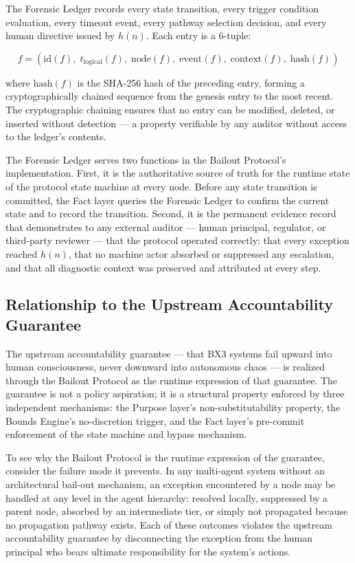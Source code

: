 The Forensic Ledger records every state transition, every trigger condition
evaluation, every timeout event, every pathway selection decision, and every
human directive issued by $h(n)$.  Each entry is a 6-tuple:

\[
f = (\text{id}(f),\; t_{\text{logical}}(f),\; \text{node}(f),\; \text{event}(f),\; \text{context}(f),\; \text{hash}(f))
\]

where $\text{hash}(f)$ is the SHA-256 hash of the preceding entry, forming a
cryptographically chained sequence from the genesis entry to the most recent.
The cryptographic chaining ensures that no entry can be modified, deleted, or
inserted without detection — a property verifiable by any auditor without
access to the ledger's contents.

The Forensic Ledger serves two functions in the Bailout Protocol's implementation.
First, it is the authoritative source of truth for the runtime state of the
protocol state machine at every node.  Before any state transition is committed,
the Fact layer queries the Forensic Ledger to confirm the current state and to
record the transition.  Second, it is the permanent evidence record that
demonstrates to any external auditor — human principal, regulator, or third-party
reviewer — that the protocol operated correctly: that every exception reached
$h(n)$, that no machine actor absorbed or suppressed any escalation, and that
all diagnostic context was preserved and attributed at every step.

\subsection{Relationship to the Upstream Accountability Guarantee}\label{sec:bailout-accountability}

The upstream accountability guarantee — that BX3 systems fail upward into
human consciousness, never downward into autonomous chaos — is realized through
the Bailout Protocol as the runtime expression of that guarantee.  The guarantee
is not a policy aspiration; it is a structural property enforced by three
independent mechanisms: the Purpose layer's non-substitutability property,
the Bounds Engine's no-discretion trigger, and the Fact layer's pre-commit
enforcement of the state machine and bypass mechanism.

To see why the Bailout Protocol is the runtime expression of the guarantee,
consider the failure mode it prevents.  In any multi-agent system without an
architectural bail-out mechanism, an exception encountered by a node may be
handled at any level in the agent hierarchy: resolved locally, suppressed by a
parent node, absorbed by an intermediate tier, or simply not propagated because
no propagation pathway exists.  Each of these outcomes violates the upstream
accountability guarantee by disconnecting the exception from the human principal
who bears ultimate responsibility for the system's actions.

